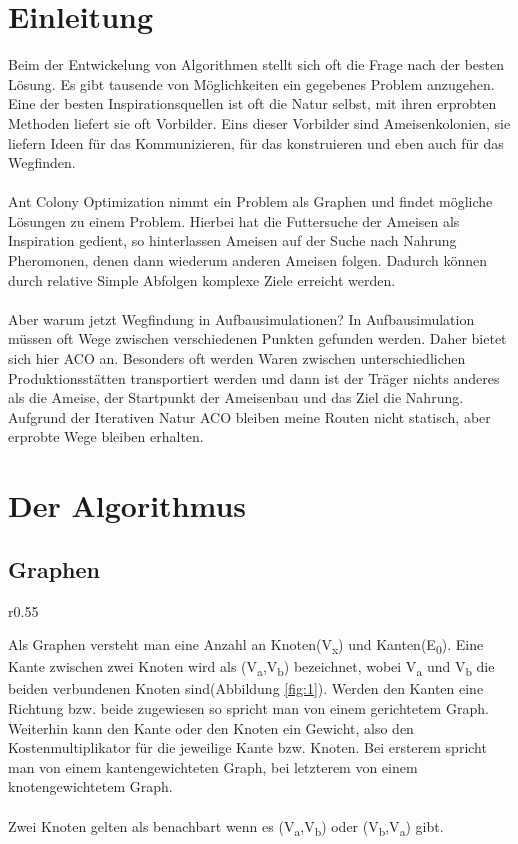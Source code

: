 \documentclass[12pt]{article}
\begin{document}
\tableofcontents
\pagebreak

\section{Einleitung} \label{Einleitung}
Beim der Entwickelung von Algorithmen stellt sich oft die Frage nach der besten Lösung. Es gibt tausende von Möglichkeiten ein gegebenes Problem anzugehen. Eine der besten Inspirationsquellen ist oft die Natur selbst, mit ihren erprobten Methoden liefert sie oft Vorbilder. Eins dieser Vorbilder sind Ameisenkolonien, sie liefern Ideen für das Kommunizieren, für das konstruieren und eben auch für das Wegfinden.\\\\
Ant Colony Optimization nimmt ein Problem als Graphen und findet mögliche Lösungen zu einem Problem. Hierbei hat die Futtersuche der Ameisen als Inspiration gedient, so hinterlassen Ameisen auf der Suche nach Nahrung Pheromonen, denen dann wiederum anderen Ameisen folgen. Dadurch können durch relative Simple Abfolgen komplexe Ziele erreicht werden.\\\\
Aber warum jetzt Wegfindung in Aufbausimulationen? In Aufbausimulation müssen oft Wege zwischen verschiedenen Punkten gefunden werden. Daher bietet sich hier ACO an. Besonders oft werden Waren zwischen unterschiedlichen Produktionsstätten transportiert werden und dann ist der Träger nichts anderes als die Ameise, der Startpunkt der Ameisenbau und das Ziel die Nahrung. Aufgrund der Iterativen Natur ACO bleiben meine Routen nicht statisch, aber erprobte Wege bleiben erhalten.
\section{Der Algorithmus}
\subsection{Graphen}
\begin{wrapfigure}[10]{r}{0.55\textwidth}
\begin{center}
\end{center}
\caption{Einfacher Graph}
\label{fig:1}
\end{wrapfigure}
Als Graphen versteht man eine Anzahl an Knoten(V\textsubscript{x}) und Kanten(E\textsubscript{0}). Eine Kante zwischen zwei Knoten wird als (V\textsubscript{a},V\textsubscript{b}) bezeichnet, wobei V\textsubscript{a} und V\textsubscript{b} die beiden verbundenen Knoten sind(Abbildung \ref{fig:1}). Werden den Kanten eine Richtung bzw. beide zugewiesen so spricht man von einem gerichtetem Graph. Weiterhin kann den Kante oder den Knoten ein Gewicht, also den Kostenmultiplikator für die jeweilige Kante bzw. Knoten. Bei ersterem spricht man von einem kantengewichteten Graph, bei letzterem von einem knotengewichtetem Graph.\\\\
Zwei Knoten gelten als benachbart wenn es (V\textsubscript{a},V\textsubscript{b}) oder (V\textsubscript{b},V\textsubscript{a}) gibt.
\end{document}

